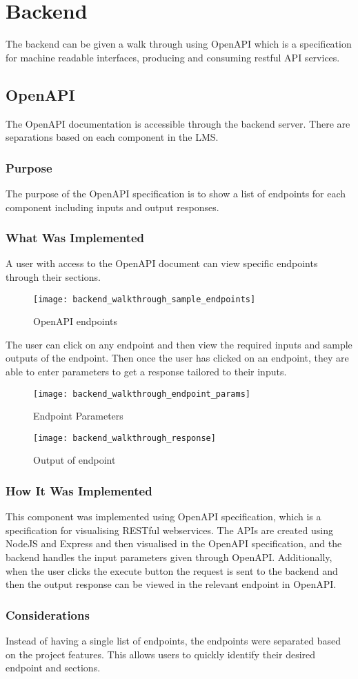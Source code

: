 \section{Backend}

The backend can be given a walk through using OpenAPI which is a specification for machine readable interfaces, producing and consuming restful API services. 

\subsection{OpenAPI}
The OpenAPI documentation is accessible through the backend server. There are separations based on each component in the LMS.

\subsubsection{Purpose}
The purpose of the OpenAPI specification is to show a list of endpoints for each component including inputs and output responses.

\subsubsection{What Was Implemented}
A user with access to the OpenAPI document can view specific endpoints through their sections. 

\begin{figure}[h!]
    \texttt{[image: backend\_walkthrough\_sample\_endpoints]}
    \centering
    \caption{OpenAPI endpoints}
\end{figure}

The user can click on any endpoint and then view the required inputs and sample outputs of the endpoint. Then once the user has clicked on an endpoint, they are able to enter parameters to get a response tailored to their inputs.

\begin{figure}[h!]
    \centering
    \texttt{[image: backend\_walkthrough\_endpoint\_params]}
    \caption{Endpoint Parameters}
\end{figure}

\begin{figure}[h!]
    \centering
    \texttt{[image: backend\_walkthrough\_response]}
    \caption{Output of endpoint}
\end{figure}

\subsubsection{How It Was Implemented}
This component was implemented using OpenAPI specification, which is a specification for visualising RESTful webservices. The APIs are created using NodeJS and Express and then visualised in the OpenAPI specification, and the backend handles the input parameters given through OpenAPI. Additionally, when the user clicks the execute button the request is sent to the backend and then the output response can be viewed in the relevant endpoint in OpenAPI.

\subsubsection{Considerations}
Instead of having a single list of endpoints, the endpoints were separated based on the project features. This allows users to quickly identify their desired endpoint and sections. 